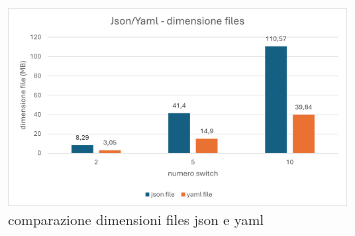 \documentclass[binding=0.6cm]{sapthesis}
\begin{document}
\begin{figure}[h]
    \centering
    \includegraphics[width=0.8\textwidth]{immagini/json_yaml_files_dim.png}
    \caption{comparazione dimensioni files json e yaml}
    \label{fig:json_yaml_files_dim}
\end{figure}
\end{document}
